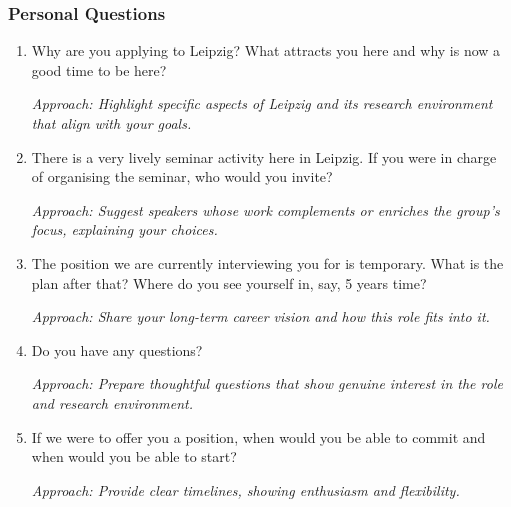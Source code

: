 \documentclass[12pt]{article}
\numberwithin{equation}{section}
\begin{document}
\subsubsection{Personal Questions}
\begin{enumerate}
    \item Why are you applying to Leipzig? What attracts you here and why is now a good time to be here?
    
    \textit{Approach: Highlight specific aspects of Leipzig and its research environment that align with your goals.}

    \item There is a very lively seminar activity here in Leipzig. If you were in charge of organising the seminar, who would you invite?
    
    \textit{Approach: Suggest speakers whose work complements or enriches the group’s focus, explaining your choices.}

    \item The position we are currently interviewing you for is temporary. What is the plan after that? Where do you see yourself in, say, 5 years time?
    
    \textit{Approach: Share your long-term career vision and how this role fits into it.}

    \item Do you have any questions?
    
    \textit{Approach: Prepare thoughtful questions that show genuine interest in the role and research environment.}

    \item If we were to offer you a position, when would you be able to commit and when would you be able to start?
    
    \textit{Approach: Provide clear timelines, showing enthusiasm and flexibility.}
\end{enumerate}
\end{document}

